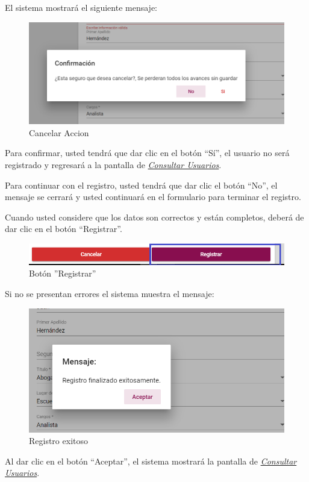   El sistema mostrará el siguiente mensaje:


  \begin{figure}[H]
  	\centering
  	\includegraphics[width=0.4\linewidth]{images/SP5/MSG29}
  	\caption{Cancelar Accion}
  	\label{mensaje29}
  \end{figure}

  Para confirmar, usted tendrá que dar clic en el botón “Sí”, el usuario no será registrado y regresará a la pantalla de \hyperlink{consultarUs}{\textit{Consultar Usuarios}}.

  Para continuar con el registro, usted tendrá que  dar clic el botón “No”, el mensaje se  cerrará y usted continuará en el formulario para terminar el registro.

  Cuando usted considere que los datos son correctos y están completos, deberá de dar clic en el botón “Registrar”.

  \begin{figure}[H]
  	\centering
  	\hypertarget{btnreg}{\includegraphics[width=0.7\linewidth]{images/SP5/BtnRegistrar}}
  	\caption{Botón ''Registrar''}
  	\label{btnreg}
  \end{figure}

  Si no se presentan errores el sistema muestra el mensaje:


  \begin{figure}[H]
  	\centering
  	\includegraphics[width=0.4\linewidth]{images/SP5/MSG5}
  	\caption{Registro exitoso}
  	\label{mensaje5}

  \end{figure}

  Al dar clic en el botón “Aceptar”, el sistema mostrará la pantalla de  \hyperlink{consultarUs}{\textit{Consultar Usuarios}}.

